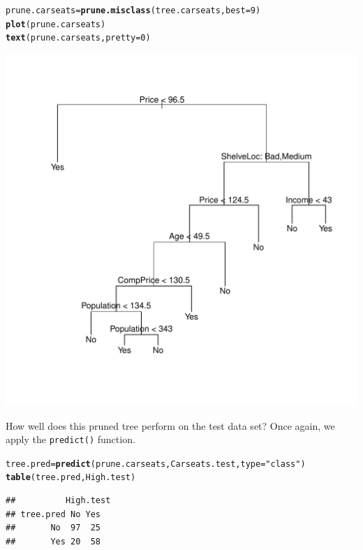 \documentclass[12pt]{article}\usepackage[]{graphicx}\usepackage[]{color}
\makeatletter
\def\maxwidth{ %
  \ifdim\Gin@nat@width>\linewidth
    \linewidth
  \else
    \Gin@nat@width
  \fi
}
\newcommand{\hlnum}[1]{\textcolor[rgb]{0.686,0.059,0.569}{#1}}%
\newcommand{\hlstr}[1]{\textcolor[rgb]{0.192,0.494,0.8}{#1}}%
\newcommand{\hlstd}[1]{\textcolor[rgb]{0.345,0.345,0.345}{#1}}%
\newcommand{\hlkwb}[1]{\textcolor[rgb]{0.69,0.353,0.396}{#1}}%
\newcommand{\hlkwc}[1]{\textcolor[rgb]{0.333,0.667,0.333}{#1}}%
\newcommand{\hlkwd}[1]{\textcolor[rgb]{0.737,0.353,0.396}{\textbf{#1}}}%
\newenvironment{kframe}{%
 \def\at@end@of@kframe{}%
 \ifinner\ifhmode%
  \def\at@end@of@kframe{\end{minipage}}%
  \begin{minipage}{\columnwidth}%
 \fi\fi%
 \def\FrameCommand##1{\hskip\@totalleftmargin \hskip-\fboxsep
 \colorbox{shadecolor}{##1}\hskip-\fboxsep
     \hskip-\linewidth \hskip-\@totalleftmargin \hskip\columnwidth}%
 \MakeFramed {\advance\hsize-\width
   \@totalleftmargin\z@ \linewidth\hsize
   \@setminipage}}%
 {\par\unskip\endMakeFramed%
 \at@end@of@kframe}
\newenvironment{knitrout}{}{} %
\makeatother
\begin{document}
\begin{knitrout}
\color{fgcolor}\begin{kframe}
\begin{alltt}
\hlstd{prune.carseats}\hlkwb{=}\hlkwd{prune.misclass}\hlstd{(tree.carseats,}\hlkwc{best}\hlstd{=}\hlnum{9}\hlstd{)}
\hlkwd{plot}\hlstd{(prune.carseats)}
\hlkwd{text}\hlstd{(prune.carseats,} \hlkwc{pretty}\hlstd{=}\hlnum{0}\hlstd{)}
\end{alltt}
\end{kframe}
\includegraphics[width=\maxwidth]{figure/unnamed-chunk-11-1} 

\end{knitrout}

How well does this pruned tree perform on the test data set? Once again, we apply the \texttt{predict()} function.

\begin{knitrout}
\color{fgcolor}\begin{kframe}
\begin{alltt}
\hlstd{tree.pred}\hlkwb{=}\hlkwd{predict}\hlstd{(prune.carseats, Carseats.test,} \hlkwc{type}\hlstd{=}\hlstr{"class"}\hlstd{)}
\hlkwd{table}\hlstd{(tree.pred, High.test)}
\end{alltt}
\begin{verbatim}
##          High.test
## tree.pred No Yes
##       No  97  25
##       Yes 20  58
\end{verbatim}
\end{kframe}
\end{knitrout}
\end{document}
